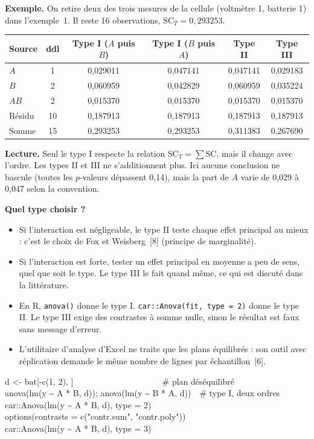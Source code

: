 \documentclass[11pt,a4paper]{article}
\theoremstyle{sj}
\theoremstyle{definition}
\theoremstyle{remark}
\newcommand{\SC}{\mathrm{SC}}
\providecommand{\og}{\guillemotleft\nobreakspace}
\providecommand{\fg}{\nobreakspace\guillemotright}
\begin{document}
\textbf{Exemple.} On retire deux des trois mesures de la cellule (voltmètre 1, batterie 1) dans l'exemple~1. Il reste 16 observations, $\SC_T=0{,}293253$.

\begin{center}
\begin{tabular}{l c c c c c}
\toprule
Source & ddl & Type I ($A$ puis $B$) & Type I ($B$ puis $A$) & Type II & Type III\\
\midrule
$A$ & 1 & 0,029011 & 0,047141 & 0,047141 & 0,029183\\
$B$ & 2 & 0,060959 & 0,042829 & 0,060959 & 0,035224\\
$AB$ & 2 & 0,015370 & 0,015370 & 0,015370 & 0,015370\\
Résidu & 10 & 0,187913 & 0,187913 & 0,187913 & 0,187913\\
\midrule
Somme & 15 & 0,293253 & 0,293253 & 0,311383 & 0,267690\\
\bottomrule
\end{tabular}
\end{center}

\textbf{Lecture.} Seul le type I respecte la relation $\SC_T=\sum\SC$, mais il change avec l'ordre. Les types II et III ne s'additionnent plus. Ici aucune conclusion ne bascule (toutes les $p$-valeurs dépassent 0,14), mais la part de $A$ varie de 0,029 à 0,047 selon la convention.

\textbf{Quel type choisir ?}
\begin{itemize}[leftmargin=1.4em]
\item Si l'interaction est négligeable, le type II teste chaque effet principal au mieux : c'est le choix de Fox et Weisberg~[8] (principe de marginalité).
\item Si l'interaction est forte, tester un effet principal \og en moyenne\fg{} a peu de sens, quel que soit le type. Le type III le fait quand même, ce qui est discuté dans la littérature.
\item En R, \texttt{anova()} donne le type I. \texttt{car::Anova(fit, type = 2)} donne le type II. Le type III exige des contrastes à somme nulle, sinon le résultat est faux sans message d'erreur.
\item L'utilitaire d'analyse d'Excel ne traite que les plans équilibrés : son outil \og avec réplication\fg{} demande le même nombre de lignes par échantillon~[6].
\end{itemize}

\begin{code}
d <- bat[-c(1, 2), ]\ \ \ \ \ \ \ \ \ \ \ \ \ \ \ \ \ \ \ \ \ \# plan déséquilibré\\
anova(lm(y \textasciitilde{} A * B, d)); anova(lm(y \textasciitilde{} B * A, d))\ \ \# type I, deux ordres\\
car::Anova(lm(y \textasciitilde{} A * B, d), type = 2)\\
options(contrasts = c("contr.sum", "contr.poly"))\\
car::Anova(lm(y \textasciitilde{} A * B, d), type = 3)
\end{code}
\end{document}
